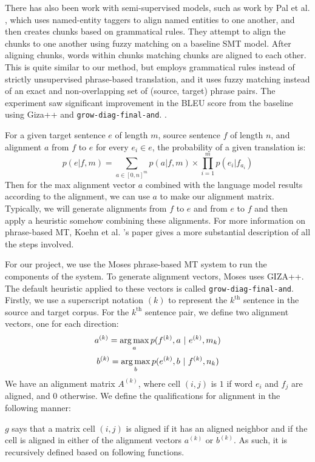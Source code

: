 \documentclass[twocolumn]{article}
\newcommand{\originalAlign}{\texttt{grow-diag-final-and}}
\begin{document}
There has also been work with semi-supervised models, such as work by
Pal et al. \cite{pnb2013}, which uses named-entity taggers to align named
entities to one another, and then creates chunks based on grammatical
rules. They attempt to align the chunks to one another using fuzzy matching on a
baseline SMT model. After aligning chunks, words within chunks matching chunks
are aligned to each other. This is quite similar to our method, but employs
grammatical rules instead of strictly unsupervised phrase-based translation, and
it uses fuzzy matching instead of an exact and non-overlapping set of
(source, target) phrase pairs. The experiment saw significant improvement in
the BLEU score from the baseline using Giza++ and
\originalAlign{}. \cite{pnb2013}.

For a given target sentence $e$ of length $m$, source sentence $f$ of length
$n$, and alignment $a$ from $f$ to $e$ for every $e_i \in e$, the probability of
a given translation is:
\[
  p(e | f, m) = \sum_{a \in [0, n]^m} p(a | f,m)
    \times \prod_{i=1}^m p(e_i | f_{a_i})
\]
Then for the max alignment vector $a$ combined with the language model results
according to the alignment, we can use $a$ to make our alignment
matrix. Typically, we will generate alignments from $f$ to $e$ and from $e$ to
$f$ and then apply a heuristic somehow combining these alignments.
For more information on phrase-based MT, Koehn et al. \cite{kom2003}'s paper
gives a more substantial description of all the steps involved.

For our project, we use the Moses phrase-based MT system to run the components
of the system. To generate alignment vectors, Moses uses GIZA++. The default
heuristic applied to these vectors is called \originalAlign{}.
Firstly, we use a superscript notation $(k)$ to represent the $k^{\text{th}}$
sentence in the source and target corpus.
For the $k^{\text{th}}$ sentence pair, we define two alignment vectors, one for
each direction:
\[ a^{(k)} = \argmax_a p(f^{(k)}, a\ |\ e^{(k)}, m_k) \]
\[ b^{(k)} = \operatorname*{arg\,max}_b p(e^{(k)}, b\ |\ f^{(k)}, n_k) \]
We have an alignment matrix $A^{(k)}$, where cell $(i,j)$ is $1$ if word $e_i$
and $f_j$ are aligned, and $0$ otherwise.
We define the qualifications for alignment in the following manner:

$g$ says that a matrix cell $(i,j)$ is aligned if it has an aligned
neighbor and if the cell is aligned in either of the alignment vectors
$a^{(k)}$ or $b^{(k)}$.
As such, it is recursively defined based on following functions.
\wrapSmall{\isAlignedFromGrow{}}
\end{document}
